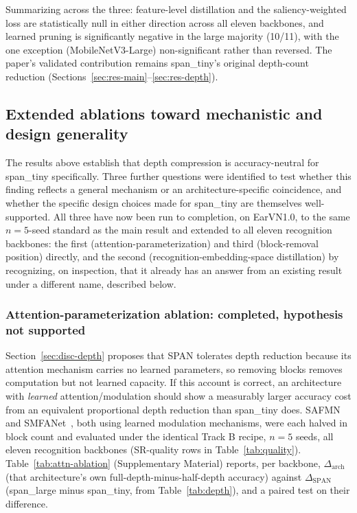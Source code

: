 \documentclass[11pt]{article}
\begin{document}
Summarizing across the three: feature-level distillation and the saliency-weighted loss are statistically null in either direction across all eleven backbones, and learned pruning is significantly negative in the large majority (10/11), with the one exception (MobileNetV3-Large) non-significant rather than reversed. The paper's validated contribution remains span\_tiny's original depth-count reduction (Sections~\ref{sec:res-main}--\ref{sec:res-depth}).

\subsection{Extended ablations toward mechanistic and design generality}
\label{sec:extended-ablations}

The results above establish that depth compression is accuracy-neutral for span\_tiny specifically. Three further questions were identified to test whether this finding reflects a general mechanism or an architecture-specific coincidence, and whether the specific design choices made for span\_tiny are themselves well-supported. All three have now been run to completion, on EarVN1.0, to the same $n=5$-seed standard as the main result and extended to all eleven recognition backbones: the first (attention-parameterization) and third (block-removal position) directly, and the second (recognition-embedding-space distillation) by recognizing, on inspection, that it already has an answer from an existing result under a different name, described below.

\subsubsection{Attention-parameterization ablation: completed, hypothesis not supported}

Section~\ref{sec:disc-depth} proposes that SPAN tolerates depth reduction because its attention mechanism carries no learned parameters, so removing blocks removes computation but not learned capacity. If this account is correct, an architecture with \emph{learned} attention/modulation should show a measurably larger accuracy cost from an equivalent proportional depth reduction than span\_tiny does. SAFMN~\cite{sun2023safmn} and SMFANet~\cite{zheng2024smfanet}, both using learned modulation mechanisms, were each halved in block count and evaluated under the identical Track B recipe, $n=5$ seeds, all eleven recognition backbones (SR-quality rows in Table~\ref{tab:quality}). Table~\ref{tab:attn-ablation} (Supplementary Material) reports, per backbone, $\Delta_{\text{arch}}$ (that architecture's own full-depth-minus-half-depth accuracy) against $\Delta_{\text{SPAN}}$ (span\_large minus span\_tiny, from Table~\ref{tab:depth}), and a paired test on their difference.
\end{document}
